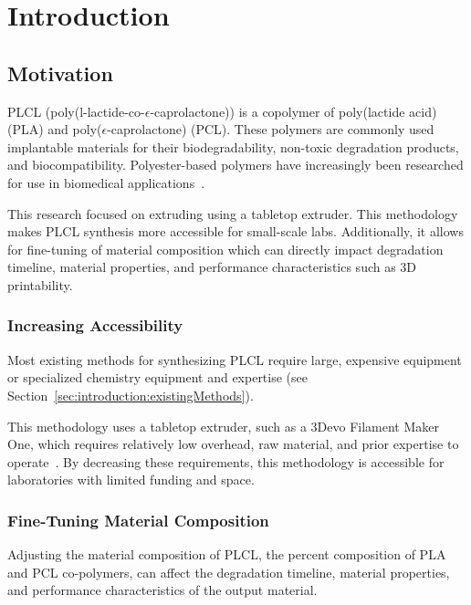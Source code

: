 \section{Introduction}
\label{sec:introduction}

\subsection{Motivation}
\label{sec:introduction:motivation}
PLCL (poly(l-lactide-co-$\epsilon$-caprolactone)) is a copolymer of poly(lactide acid) (PLA) and poly($\epsilon$-caprolactone) (PCL). These polymers are commonly used implantable materials for their biodegradability, non-toxic degradation products, and biocompatibility. Polyester-based polymers have increasingly been researched for use in biomedical applications~\cite{RefWorks:RefID:303-luo2023fabrication,RefWorks:RefID:31-fernández2012synthesis,RefWorks:RefID:19-zhang2021synthesis,RefWorks:RefID:304-jeong2018mechanical}.

This research focused on extruding using a tabletop extruder. This methodology makes PLCL synthesis more accessible for small-scale labs. Additionally, it allows for fine-tuning of material composition which can directly impact degradation timeline, material properties, and performance characteristics such as 3D printability.

\subsubsection{Increasing Accessibility}
\label{sec:introduction:motivation:increasingAccessibility}

Most existing methods for synthesizing PLCL require large, expensive equipment or specialized chemistry equipment and expertise (see Section~\ref{sec:introduction:existingMethods}).

This methodology uses a tabletop extruder, such as a 3Devo Filament Maker One, which requires relatively low overhead, raw material, and prior expertise to operate~\cite{RefWorks:RefID:392-3devo}. By decreasing these requirements, this methodology is accessible for laboratories with limited funding and space.

\subsubsection{Fine-Tuning Material Composition}
\label{sec:introduction:motivation:materialComposition}

Adjusting the material composition of PLCL, the percent composition of PLA and PCL co-polymers, can affect the degradation timeline, material properties, and performance characteristics of the output material.

